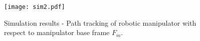 \documentclass[a4paper, 10pt, conference]{ieeeconf}
\begin{document}
%
%
%
%
%
%
%
%
\begin{figure}[t]
  \centering
  \texttt{[image: sim2.pdf]}
  \caption{Simulation results - Path tracking of robotic manipulator with respect to manipulator base frame $F_m$.}
  \label{fig:track_delta}
\end{figure}
\end{document}
